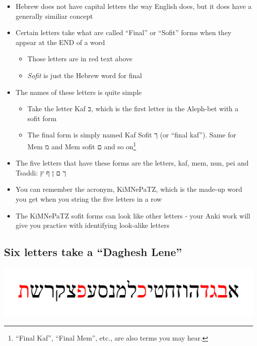 \documentclass[
]{turabian-researchpaper}
\providecommand{\tightlist}{%
  \setlength{\itemsep}{0pt}\setlength{\parskip}{0pt}}
\begin{document}
\begin{itemize}
\tightlist
\item
  Hebrew does not have capital letters the way English does, but it does have a generally similiar concept
\item
  Certain letters take what are called ``Final'' or ``Sofit'' forms when they appear at the END of a word

  \begin{itemize}
  \tightlist
  \item
    Those letters are in red text above
  \item
    \emph{Sofit} is just the Hebrew word for final
  \end{itemize}
\item
  The names of these letters is quite simple

  \begin{itemize}
  \tightlist
  \item
    Take the letter Kaf כּ, which is the first letter in the Aleph-bet with a sofit form
  \item
    The final form is simply named Kaf Sofit ך (or ``final kaf''). Same for Mem מ and Mem sofit ם and so on\footnote{``Final Kaf'', ``Final Mem'', etc., are also terms you may hear.}
  \end{itemize}
\item
  The five letters that have these forms are the letters, kaf, mem, nun, pei and Tsaddi: ך ם ן ף ץ
\item
  You can remember the acronym, KiMNePaTZ, which is the made-up word you get when you string the five letters in a row
\item
  The KiMNePaTZ sofit forms can look like other letters - your Anki work will give you practice with identifying look-alike letters
\end{itemize}

\hypertarget{one_4}{%
\subsection{Six letters take a ``Daghesh Lene''}\label{one_4}}

\begin{center}\includegraphics[width=500pt]{images/bgdkpt} \end{center}
\end{document}
